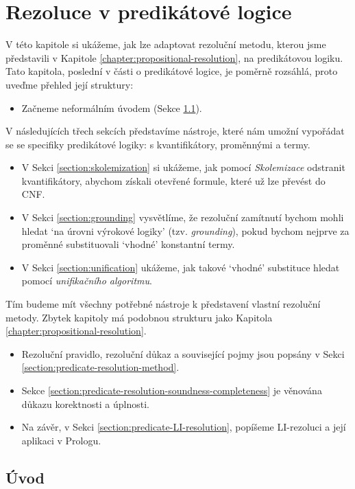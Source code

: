 \chapter{Rezoluce v predikátové logice}
\label{chapter:predicate-resolution}

V této kapitole si ukážeme, jak lze adaptovat rezoluční metodu, kterou jsme představili v Kapitole \ref{chapter:propositional-resolution}, na predikátovou logiku. Tato kapitola, poslední v části o predikátové logice, je poměrně rozsáhlá, proto uveďme přehled její struktury:

\begin{itemize}
    \item Začneme neformálním úvodem (Sekce \ref{section:predicate-resolution-intro}).
\end{itemize}
V následujících třech sekcích představíme nástroje, které nám umožní vypořádat se se specifiky predikátové logiky: s kvantifikátory, proměnnými a termy.
\begin{itemize}
    \item V Sekci \ref{section:skolemization} si ukážeme, jak pomocí \emph{Skolemizace} odstranit kvantifikátory, abychom získali otevřené formule, které už lze převést do CNF.
    \item V Sekci \ref{section:grounding} vysvětlíme, že rezoluční zamítnutí bychom mohli hledat `na úrovni výrokové logiky' (tzv. \emph{grounding}), pokud bychom nejprve za proměnné substituovali `vhodné' konstantní termy.
    \item V Sekci \ref{section:unification} ukážeme, jak takové `vhodné' substituce hledat pomocí \emph{unifikačního algoritmu}.
\end{itemize}
Tím budeme mít všechny potřebné nástroje k představení vlastní rezoluční metody. Zbytek kapitoly má podobnou strukturu jako Kapitola \ref{chapter:propositional-resolution}.
\begin{itemize}
    \item Rezoluční pravidlo, rezoluční důkaz a související pojmy jsou popsány v Sekci \ref{section:predicate-resolution-method}.
    \item Sekce \ref{section:predicate-resolution-soundness-completeness} je věnována důkazu korektnosti a úplnosti.
    \item Na závěr, v Sekci \ref{section:predicate-LI-resolution}, popíšeme LI-rezoluci a její aplikaci v Prologu.
\end{itemize}


\section{Úvod}\label{section:predicate-resolution-intro}

